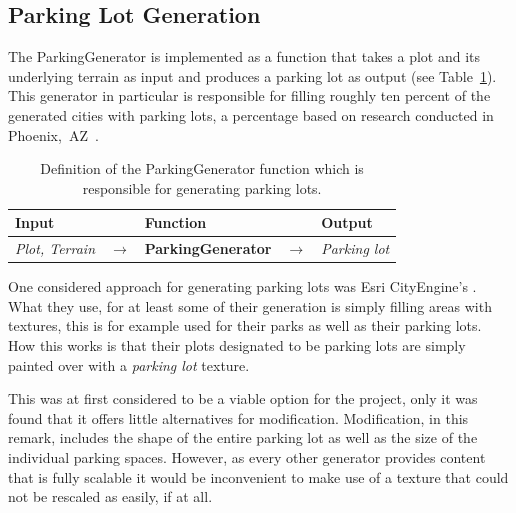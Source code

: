 \subsection{Parking Lot Generation}
The ParkingGenerator is implemented as a function that takes a plot and its underlying terrain as input and produces a parking lot as output (see Table~\ref{table:parking}).
This generator in particular is responsible for filling roughly ten percent of the generated cities with parking lots, a percentage based on research conducted in Phoenix,~AZ~\cite{percent}.
\begin{table}[H]
   \centering
   \begin{tabular}{lllll}
     \textbf{Input}                           &               & \textbf{Function}            &               & \textbf{Output}         \\
     \midrule
     \textit{Plot, Terrain}                   & $\rightarrow$ & \textbf{ParkingGenerator}       & $\rightarrow$ & \textit{Parking lot}           \\
     \bottomrule
   \end{tabular}

   \caption{Definition of the ParkingGenerator function which is responsible for generating parking lots.}
   \label{table:parking}
 \end{table}
 \vspace{-0.4cm}


One considered approach for generating parking lots was Esri CityEngine's \cite{Esri}.  %
What they use, for at least some of their generation is simply filling areas with textures, this is for example used for their parks as well as their parking lots. 
How this works is that their plots designated to be parking lots are simply painted over with a \textit{parking lot} texture.
 
This was at first considered to be a viable option for the project, only it was found that it offers little alternatives for modification. 
Modification, in this remark, includes the shape of the entire parking lot as well as the size of the individual parking spaces.
However, as every other generator provides content that is fully scalable it would be inconvenient to make use of a texture that could not be rescaled as easily, if at all.

